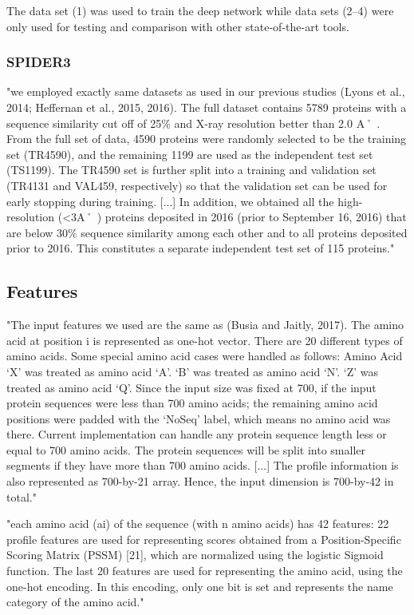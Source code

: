 \documentclass[]{scrartcl}
\begin{document}
The data set (1) was used to train the deep network while data sets (2–4) were only used for testing and comparison with other state-of-the-art tools. \cite{Fang2017}
\subsubsection{SPIDER3}
"we employed exactly same datasets as used in our previous studies (Lyons et al., 2014; Heffernan et al., 2015, 2016). The full dataset contains 5789 proteins with a sequence similarity cut off of 25\% and X-ray resolution better than 2.0 A˚ . From the full set of data, 4590 proteins were randomly selected to be the training set (TR4590), and the remaining 1199 are used as the independent test set (TS1199). The TR4590 set is further split into a training and validation set (TR4131 and VAL459, respectively) so that the validation set can be used for early stopping during training. [...] In addition, we obtained all the high-resolution (<3A˚ ) proteins deposited in 2016 (prior to September 16, 2016) that are below 30\% sequence similarity among each other and to all proteins deposited prior to 2016. This constitutes a separate independent test set of 115 proteins." \cite{Heffernan2017}

\subsection{Features}
"The input features we used are the same as (Busia and Jaitly, 2017). The amino acid at position i is represented as one-hot vector. There are 20 different types of amino acids. Some special amino acid cases were handled as follows: Amino Acid ‘X’ was treated as amino acid ‘A’. ‘B’ was treated as amino acid ‘N’. ‘Z’ was treated as amino acid ‘Q’. Since the input size was fixed at 700, if the input protein sequences were less than 700 amino acids; the remaining amino acid positions were padded with the ‘NoSeq’ label, which means no amino acid was there. Current implementation can handle any protein sequence length less or equal to 700 amino acids. The protein sequences will be split into smaller segments if they have more than 700 amino acids. [...] The profile information is also represented as 700-by-21 array. Hence, the input dimension is 700-by-42 in total." \cite{Fang2017}

"each amino acid (ai) of the sequence (with n amino acids) has 42 features: 22 profile features are used for representing scores obtained from a Position-Specific Scoring Matrix (PSSM) [21], which are normalized using the logistic Sigmoid function. The last 20 features are used for representing the amino acid, using the one-hot encoding. In this encoding, only one bit is set and represents the name category of the amino acid." \cite{Hattori2017}
\end{document}
